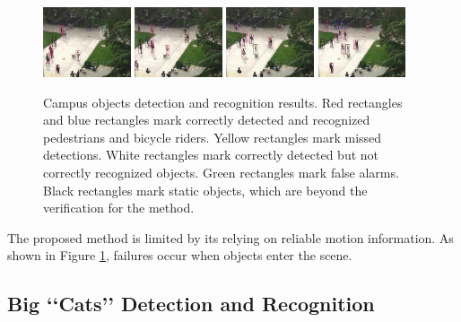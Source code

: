 \documentclass[10pt,twocolumn,letterpaper]{article}
\begin{document}
\begin{figure}
\includegraphics[width=0.23\textwidth,bb=0 0 720 576]{166.jpg}
\includegraphics[width=0.23\textwidth,bb=0 0 720 576]{251.jpg}
\includegraphics[width=0.23\textwidth,bb=0 0 720 576]{326.jpg}
\includegraphics[width=0.23\textwidth,bb=0 0 720 576]{366.jpg}
\caption{Campus objects detection and recognition results. Red rectangles and blue rectangles mark correctly detected and recognized pedestrians and bicycle riders. Yellow rectangles mark missed detections. White rectangles mark correctly detected but not correctly recognized objects. Green rectangles mark false alarms. Black rectangles mark static objects, which are beyond the verification for the method.}
\label{fig:result}
\end{figure}

The proposed method is limited by its relying on reliable motion information. As shown in Figure \ref{fig:result}, failures occur when objects enter the scene.

\subsection{Big {\lq\lq}{Cats}{\rq\rq} Detection and Recognition}
\end{document}
